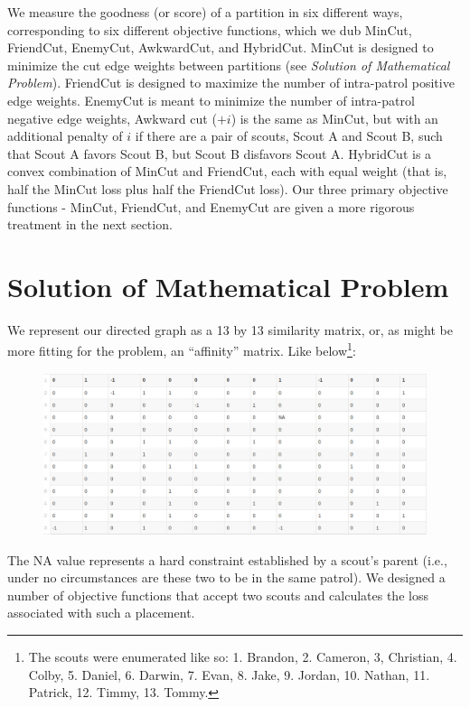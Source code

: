 \documentclass{amsart}
\theoremstyle{definition}
\theoremstyle{remark}
\numberwithin{equation}{section}
\begin{document}
We measure the goodness (or score) of a partition in six different ways, corresponding to six different objective functions, which we dub MinCut, FriendCut, EnemyCut, AwkwardCut, and HybridCut. MinCut is designed to minimize the cut edge weights between partitions (see \textit{Solution of Mathematical Problem}). FriendCut is designed to maximize the number of intra-patrol positive edge weights. EnemyCut is meant to minimize the number of intra-patrol negative edge weights, Awkward cut ($+i$) is the same as MinCut, but with an additional penalty of $i$ if there are a pair of scouts, Scout A and Scout B, such that Scout A favors Scout B, but Scout B disfavors Scout A. HybridCut is a convex combination of MinCut and FriendCut, each with equal weight (that is, half the MinCut loss plus half the FriendCut loss). Our three primary objective functions - MinCut, FriendCut, and EnemyCut are given a more rigorous treatment in the next section.

\section*{Solution of Mathematical Problem}
We represent our directed graph as a 13 by 13 similarity matrix, or, as might
be more fitting for the problem, an ``affinity'' matrix. Like below\footnote{The scouts were enumerated like so: 1. Brandon, 2. Cameron, 3, Christian, 4. Colby, 5. Daniel, 6. Darwin, 7. Evan, 8. Jake, 9. Jordan, 10. Nathan, 11. Patrick, 12. Timmy, 13. Tommy.}:

\begin{figure}[h]
    \centering
    \includegraphics[scale=0.28]{data}
\end{figure}

The NA value represents a hard constraint established by a scout's parent (i.e., under no circumstances are these two to be in the same patrol). We designed a number of objective functions that accept two scouts and calculates the loss associated with such a placement.
\end{document}

